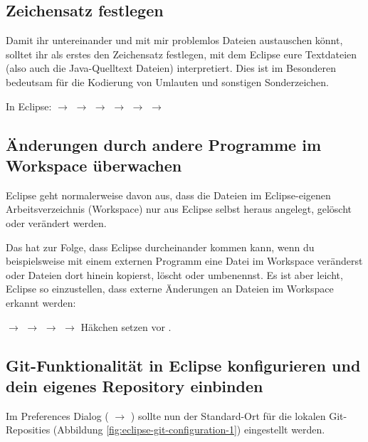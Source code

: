 \subsection{Zeichensatz festlegen}

Damit ihr untereinander und mit mir problemlos Dateien austauschen könnt,
solltet ihr als erstes den Zeichensatz festlegen, mit dem Eclipse eure
Textdateien (also auch die Java-Quelltext Dateien) interpretiert. Dies ist im
Besonderen bedeutsam für die Kodierung von Umlauten und sonstigen
Sonderzeichen.

In Eclipse:  $\rightarrow$  $\rightarrow$
 $\rightarrow$  $\rightarrow$  $\rightarrow$  $\rightarrow$ 

\subsection{Änderungen durch andere Programme im Workspace überwachen}

Eclipse geht normalerweise davon aus, dass die Dateien im Eclipse-eigenen
Arbeitsverzeichnis (Workspace) nur aus Eclipse selbst heraus angelegt, gelöscht
oder verändert werden.

Das hat zur Folge, dass Eclipse durcheinander kommen kann, wenn du
beispielsweise mit einem externen Programm eine Datei im Workspace veränderst
oder Dateien dort hinein kopierst, löscht oder umbenennst.
Es ist aber leicht, Eclipse so einzustellen, dass externe Änderungen an Dateien
im Workspace erkannt werden:

 $\rightarrow$  $\rightarrow$
 $\rightarrow$  $\rightarrow$
Häkchen setzen vor .

\subsection{Git-Funktionalität in Eclipse konfigurieren und dein eigenes
Repository einbinden}

Im Preferences Dialog ( $\rightarrow$ ) sollte
nun der Standard-Ort für die lokalen Git-Reposities (Abbildung
\ref{fig:eclipse-git-configuration-1}) 
eingestellt werden.

